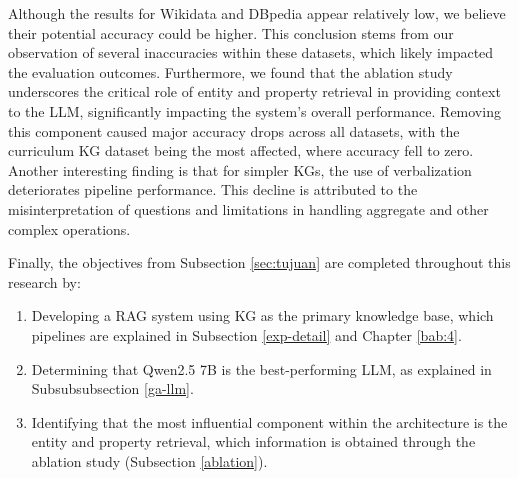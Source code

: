 Although the results for Wikidata and DBpedia appear relatively low, we believe their potential accuracy could be higher. This conclusion stems from our observation of several inaccuracies within these datasets, which likely impacted the evaluation outcomes. Furthermore, we found that the ablation study underscores the critical role of entity and property retrieval in providing context to the LLM, significantly impacting the system's overall performance. Removing this component caused major accuracy drops across all datasets, with the curriculum KG dataset being the most affected, where accuracy fell to zero. Another interesting finding is that for simpler KGs, the use of verbalization deteriorates pipeline performance. This decline is attributed to the misinterpretation of questions and limitations in handling aggregate and other complex operations.

Finally, the objectives from Subsection \ref{sec:tujuan} are completed throughout this research by:
\begin{enumerate}
    \item Developing a RAG system using KG as the primary knowledge base, which pipelines are explained in Subsection \ref{exp-detail} and Chapter \ref{bab:4}.
    \item Determining that Qwen2.5 7B is the best-performing LLM, as explained in Subsubsubsection \ref{ga-llm}.
    \item Identifying that the most influential component within the architecture is the entity and property retrieval, which information is obtained through the ablation study (Subsection \ref{ablation}).
\end{enumerate}

